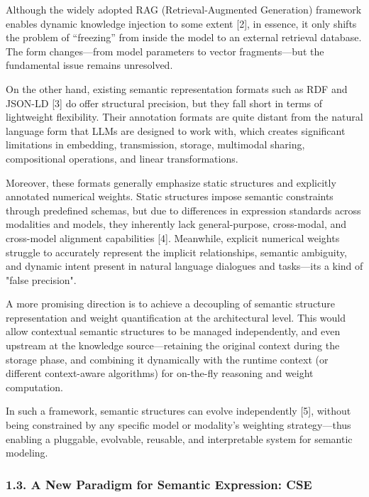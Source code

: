 \documentclass[conference]{IEEEtran}
\begin{document}
Although the widely adopted RAG (Retrieval-Augmented Generation)
framework enables dynamic knowledge injection to some extent {[}2{]}, in
essence, it only shifts the problem of ``freezing'' from inside the
model to an external retrieval database. The form changes---from model
parameters to vector fragments---but the fundamental issue remains
unresolved.

On the other hand, existing semantic representation formats such as RDF
and JSON-LD {[}3{]} do offer structural precision, but they fall short
in terms of lightweight flexibility. Their annotation formats are quite
distant from the natural language form that LLMs are designed to work
with, which creates significant limitations in embedding, transmission,
storage, multimodal sharing, compositional operations, and linear
transformations.

Moreover, these formats generally emphasize static structures and
explicitly annotated numerical weights. Static structures impose
semantic constraints through predefined schemas, but due to differences
in expression standards across modalities and models, they inherently
lack general-purpose, cross-modal, and cross-model alignment
capabilities {[}4{]}. Meanwhile, explicit numerical weights struggle to
accurately represent the implicit relationships, semantic ambiguity, and
dynamic intent present in natural language dialogues and
tasks---it\textquotesingle s a kind of "false precision".

A more promising direction is to achieve a decoupling of semantic
structure representation and weight quantification at the architectural
level. This would allow contextual semantic structures to be managed
independently, and even upstream at the knowledge source---retaining the
original context during the storage phase, and combining it dynamically
with the runtime context (or different context-aware algorithms) for
on-the-fly reasoning and weight computation.

In such a framework, semantic structures can evolve independently
{[}5{]}, without being constrained by any specific model or modality's
weighting strategy---thus enabling a pluggable, evolvable, reusable, and
interpretable system for semantic modeling.

\subsubsection{1.3. A New Paradigm for Semantic Expression:
CSE}\label{13-a-new-paradigm-for-semantic-expression-cse}
\end{document}
